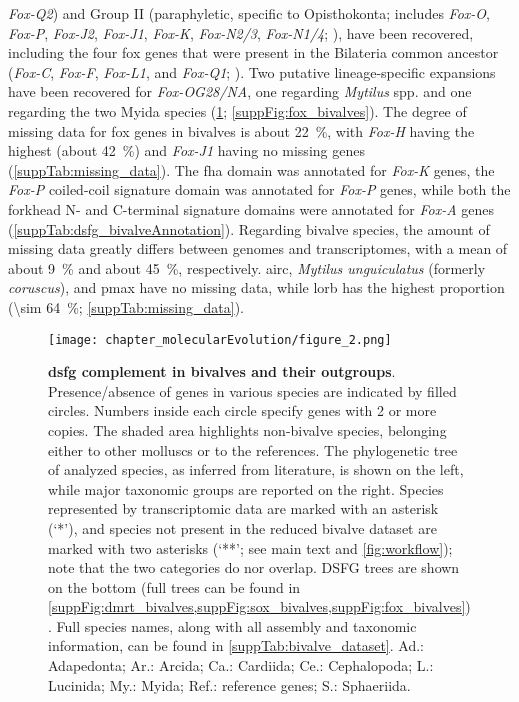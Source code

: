 \textit{Fox-Q2}) and Group II (paraphyletic, specific to Opisthokonta; includes \textit{Fox-O}, \textit{Fox-P}, \textit{Fox-J2}, \textit{Fox-J1}, \textit{Fox-K}, \textit{Fox-N2/3}, \textit{Fox-N1/4}; ), have been recovered, including the four \gls{fox} genes that were present in the Bilateria common ancestor (\textit{Fox-C}, \textit{Fox-F}, \textit{Fox-L1}, and \textit{Fox-Q1}; ). Two putative lineage-specific expansions have been recovered for \textit{Fox-OG28/NA}, one regarding \textit{Mytilus} spp. and one regarding the two Myida species (\cref{fig:DSFG_bivalveCompilation}; \cref{suppFig:fox_bivalves}). The degree of missing data for \gls{fox} genes in bivalves is about \qty{22}{\percent}, with \textit{Fox-H} having the highest (about \qty{42}{\percent}) and \textit{Fox-J1} having no missing genes (\cref{suppTab:missing_data}). The \gls{fha} domain was annotated for \textit{Fox-K} genes, the \textit{Fox-P} coiled-coil signature domain was annotated for \textit{Fox-P} genes, while both the forkhead N- and C-terminal signature domains were annotated for \textit{Fox-A} genes (\cref{suppTab:dsfg_bivalveAnnotation}).
Regarding bivalve species, the amount of missing data greatly differs between genomes and transcriptomes, with a mean of about \qty{9}{\percent} and about \qty{45}{\percent}, respectively. \gls{airc}, \textit{Mytilus unguiculatus} (formerly \textit{coruscus}), and \gls{pmax} have no missing data, while \gls{lorb} has the highest proportion (\qty{\sim 64}{\percent}; \cref{suppTab:missing_data}).

\begin{figure}
	\centering
	\texttt{[image: chapter\_molecularEvolution/figure\_2.png]}
	
	\caption[\textbf{\gls{dsfg} complement in bivalves and their outgroups}]
	{
		\textbf{\gls{dsfg} complement in bivalves and their outgroups}. Presence/absence of genes in various species are indicated by filled circles. Numbers inside each circle specify genes with 2 or more copies. The shaded area highlights non-bivalve species, belonging either to other molluscs or to the references. The phylogenetic tree of analyzed species, as inferred from literature, is shown on the left, while major taxonomic groups are reported on the right. Species represented by transcriptomic data are marked with an asterisk (‘*’), and species not present in the reduced bivalve dataset are marked with two asterisks (‘**’; see main text and \cref{fig:workflow}); note that the two categories do nor overlap. DSFG trees are shown on the bottom (full trees can be found in \cref{suppFig:dmrt_bivalves,suppFig:sox_bivalves,suppFig:fox_bivalves}). Full species names, along with all assembly and taxonomic information, can be found in \cref{suppTab:bivalve_dataset}.  Ad.: Adapedonta; Ar.: Arcida; Ca.: Cardiida; Ce.: Cephalopoda; L.: Lucinida; My.: Myida; Ref.: reference genes; S.: Sphaeriida.
	}
	\label{fig:DSFG_bivalveCompilation}
\end{figure}

